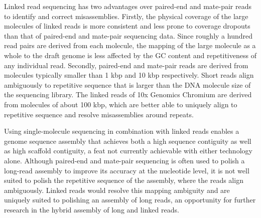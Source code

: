 \documentclass{bmcart}
\begin{document}
Linked read sequencing has two advantages over paired-end and mate-pair reads to identify and correct misassemblies. Firstly, the physical coverage of the large molecules of linked reads is more consistent and less prone to coverage dropouts than that of paired-end and mate-pair sequencing data. Since roughly a hundred read pairs are derived from each molecule, the mapping of the large molecule as a whole to the draft genome is less affected by the GC content and repetitiveness of any individual read. Secondly, paired-end and mate-pair reads are derived from molecules typically smaller than 1 kbp and 10 kbp respectively. Short reads align ambiguously to repetitive sequence that is larger than the DNA molecule size of the sequencing library. The linked reads of 10x Genomics Chromium are derived from molecules of about 100 kbp, which are better able to uniquely align to repetitive sequence and resolve misassemblies around repeats.

Using single-molecule sequencing in combination with linked reads enables a genome sequence assembly that achieves both a high sequence contiguity as well as high scaffold contiguity, a feat not currently achievable with either technology alone. Although paired-end and mate-pair sequencing is often used to polish a long-read assembly to improve its accuracy at the nucleotide level, it is not well suited to polish the repetitive sequence of the assembly, where the reads align ambiguously. Linked reads would resolve this mapping ambiguity and are uniquely suited to polishing an assembly of long reads, an opportunity for further research in the hybrid assembly of long and linked reads.
\end{document}
